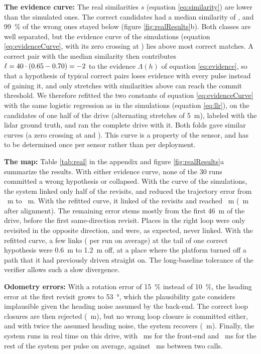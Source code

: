 \textbf{The evidence curve:} The real similarities $s$ (equation \ref{eq:similarity}) are lower than the simulated ones. The correct candidates had a median similarity of \RealSimTrueMed{}, and \SI{99}{\percent} of the wrong ones stayed below \RealSimFalsePnn{} (figure \ref{fig:realResults}b). Both classes are well separated, but the evidence curve of the simulations (equation \ref{eq:evidenceCurve}, with its zero crossing at \LLRmid{}) lies above most correct matches. A correct pair with the median similarity then contributes $\ell = 40 \cdot (0.65 - 0.70) = -2$ to the evidence $\Lambda(h)$ of equation \ref{eq:evidence}, so that a hypothesis of typical correct pairs loses evidence with every pulse instead of gaining it, and only stretches with similarities above \LLRmid{} can reach the commit threshold. We therefore refitted the two constants of equation \ref{eq:evidenceCurve} with the same logistic regression as in the simulations (equation \ref{eq:llr}), on the candidates of one half of the drive (alternating stretches of \SI{5}{\meter}), labeled with the lidar ground truth, and ran the complete drive with it. Both folds gave similar curves (a zero crossing at \RealMidEven{} and \RealMidOdd{}). This curve is a property of the sensor, and has to be determined once per sensor rather than per deployment.

\textbf{The map:} Table \ref{tab:real} in the appendix and figure \ref{fig:realResults}a summarize the results. With either evidence curve, none of the 30 runs committed a wrong hypothesis or collapsed. With the curve of the simulations, the system linked only half of the revisits, and reduced the trajectory error from \RealATEodo{}~\si{\meter} to \RealATESim{}~\si{\meter}. With the refitted curve, it linked \RealCovEven{} of the revisits and reached \RealATEEven{}~\si{\meter} (\RealATEalEven{}~\si{\meter} after alignment). The remaining error stems mostly from the first \SI{46}{\meter} of the drive, before the first same-direction revisit. Places in the right loop were only revisited in the opposite direction, and were, as expected, never linked. With the refitted curve, a few links (\RealWrongLinksEven{} per run on average) at the tail of one correct hypothesis were \SI{0.6}{\meter} to \SI{1.2}{\meter} off, at a place where the platform turned off a path that it had previously driven straight on. The long-baseline tolerance of the verifier allows such a slow divergence.

\textbf{Odometry errors:} With a rotation error of \SI{15}{\percent} instead of \SI{10}{\percent}, the heading error at the first revisit grows to \SI{53}{\degree}, which the plausibility gate considers implausible given the heading noise assumed by the back-end. The correct loop closures are then rejected (\RealATEcliffEven{}~\si{\meter}), but no wrong loop closure is committed either, and with twice the assumed heading noise, the system recovers (\RealATEcliffNoise{}~\si{\meter}). Finally, the system runs in real time on this drive, with \RealFrontendMs{}~\si{\milli\second} for the front-end and \RealSlamMs{}~\si{\milli\second} for the rest of the system per pulse on average, against \RealBudgetMs{}~\si{\milli\second} between two calls.
